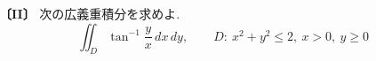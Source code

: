 \noindent\textbf{〔II〕}
次の広義重積分を求めよ.
\[
\iint_D \tan^{-1}\frac{y}{x}\,dx\,dy,\qquad
D:\ x^2+y^2\le 2,\ x>0,\ y\ge 0
\]

